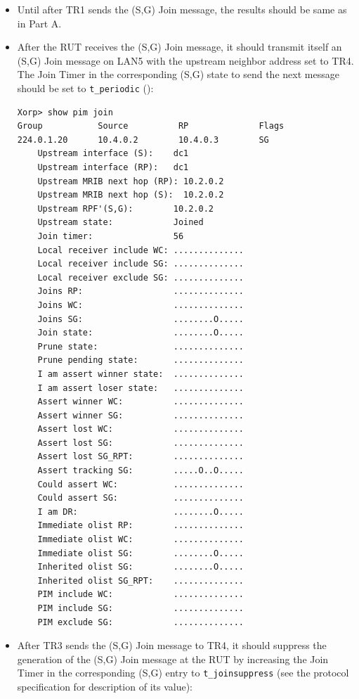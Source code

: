\documentclass[11pt]{report}
\begin{document}

\begin{itemize}

  \item Until after TR1 sends the (S,G) Join message, the results should be
  same as in Part A.

  \item After the RUT receives the (S,G) Join message, it should
  transmit itself an (S,G) Join message on LAN5 with the upstream
  neighbor address set to TR4. The Join Timer in the corresponding (S,G)
  state to send the next message should be set to \verb=t_periodic=
  ({\PimsmTPeriodic}):

\begin{verbatim}
Xorp> show pim join 
Group           Source          RP              Flags
224.0.1.20      10.4.0.2        10.4.0.3        SG   
    Upstream interface (S):    dc1
    Upstream interface (RP):   dc1
    Upstream MRIB next hop (RP): 10.2.0.2
    Upstream MRIB next hop (S):  10.2.0.2
    Upstream RPF'(S,G):        10.2.0.2
    Upstream state:            Joined 
    Join timer:                56
    Local receiver include WC: ..............
    Local receiver include SG: ..............
    Local receiver exclude SG: ..............
    Joins RP:                  ..............
    Joins WC:                  ..............
    Joins SG:                  ........O.....
    Join state:                ........O.....
    Prune state:               ..............
    Prune pending state:       ..............
    I am assert winner state:  ..............
    I am assert loser state:   ..............
    Assert winner WC:          ..............
    Assert winner SG:          ..............
    Assert lost WC:            ..............
    Assert lost SG:            ..............
    Assert lost SG_RPT:        ..............
    Assert tracking SG:        .....O..O.....
    Could assert WC:           ..............
    Could assert SG:           ..............
    I am DR:                   ........O.....
    Immediate olist RP:        ..............
    Immediate olist WC:        ..............
    Immediate olist SG:        ........O.....
    Inherited olist SG:        ........O.....
    Inherited olist SG_RPT:    ..............
    PIM include WC:            ..............
    PIM include SG:            ..............
    PIM exclude SG:            ..............
\end{verbatim}

  \item After TR3 sends the (S,G) Join message to TR4, it should suppress
  the generation of the (S,G) Join message at the RUT by increasing the
  Join Timer in the corresponding (S,G) entry to \verb=t_joinsuppress=
  (see the protocol specification for description of its value):


\end{itemize}
\end{document}
